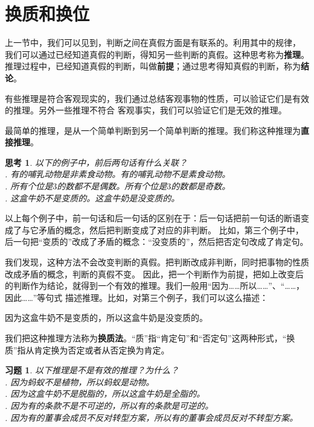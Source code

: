 \documentclass[12pt,UTF8]{ctexbook}
\newtheorem{sk}{思考}[section]
\newtheorem{xt}{习题}[section]
\begin{document}
\section{换质和换位}
上一节中，我们可以见到，判断之间在真假方面是有联系的。利用其中的规律，
我们可以通过已经知道真假的判断，得知另一些判断的真假。这种思考称为\textbf{推理}。
推理过程中，已经知道真假的判断，叫做\textbf{前提}；通过思考得知真假的判断，称为\textbf{结论}。

有些推理是符合客观现实的，我们通过总结客观事物的性质，可以验证它们是有效的推理。另外一些推理不符合
客观事实，我们可以验证它们是无效的推理。

最简单的推理，是从一个简单判断到另一个简单判断的推理。我们称这种推理为\textbf{直接推理}。
\begin{sk}\label{sk:2-1-0} 
    以下的例子中，前后两句话有什么关联？\\
    . 有的哺乳动物是非素食动物。有的哺乳动物不是素食动物。\\
    . 所有个位是$3$的数都不是偶数。所有个位是$3$的数都是奇数。\\
    . 这盒牛奶不是变质的。这盒牛奶是没变质的。
\end{sk}
以上每个例子中，前一句话和后一句话的区别在于：后一句话把前一句话的断语变成了与它矛盾的概念，然后把判断变成了对应的非判断。
比如，第三个例子中，后一句把“变质的”改成了矛盾的概念：“没变质的”，然后把否定句改成了肯定句。

我们发现，这种方法不会改变判断的真假。把判断改成非判断，同时把事物的性质改成矛盾的概念，判断的真假不变。
因此，把一个判断作为前提，把如上改变后的判断作为结论，就得到一个有效的推理。我们一般用“因为……所以……”、“……，因此……”等句式
描述推理。比如，对第三个例子，我们可以这么描述：

因为这盒牛奶不是变质的，所以这盒牛奶是没变质的。

我们把这种推理方法称为\textbf{换质法}。“质”指“肯定句”和“否定句”这两种形式，“换质”指从肯定换为否定或者从否定换为肯定。
\begin{xt}\label{xt:2-0-0}
    以下推理是不是有效的推理？为什么？\\
    . 因为蚂蚁不是植物，所以蚂蚁是动物。 \\
    . 因为这盒牛奶不是脱脂的，所以这盒牛奶是全脂的。 \\
    . 因为有的条款不是不可逆的，所以有的条款是可逆的。 \\
    . 因为有的董事会成员不反对转型方案，所以有的董事会成员反对不转型方案。
\end{xt}
\end{document}
